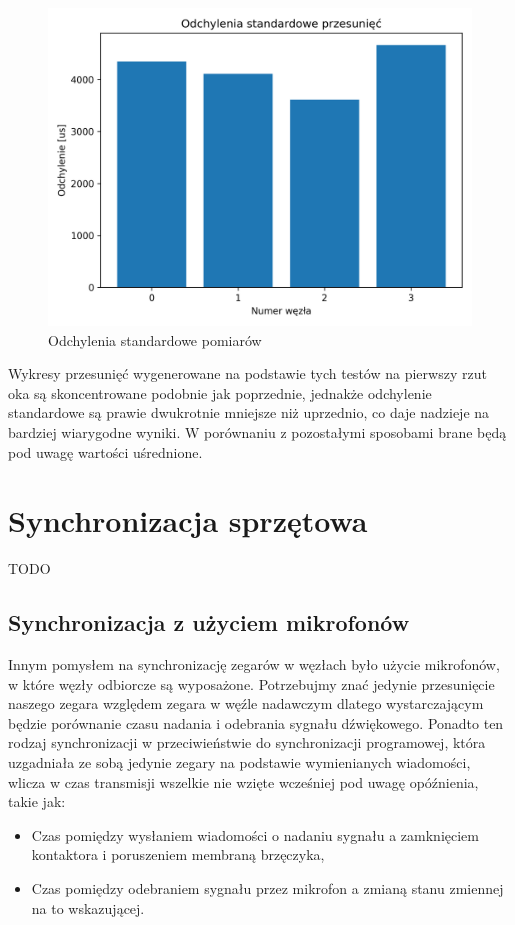 \begin{figure}[H]
    \centering
    \includegraphics[width=.49\textwidth]{pics/time_deltas/stddev.png}
    \caption{Odchylenia standardowe pomiarów}
    \label{pic:stddev_deltas}
\end{figure}

Wykresy przesunięć wygenerowane na podstawie tych testów na pierwszy rzut oka są skoncentrowane podobnie jak poprzednie, jednakże odchylenie standardowe są prawie dwukrotnie mniejsze niż uprzednio, co daje nadzieje na bardziej wiarygodne wyniki. W porównaniu z pozostałymi sposobami brane będą pod uwagę wartości uśrednione.

\section{Synchronizacja sprzętowa}

TODO

\subsection{Synchronizacja z użyciem mikrofonów}\label{sec:mic_sync}

Innym pomysłem na synchronizację zegarów w węzłach było użycie mikrofonów, w które węzły odbiorcze są wyposażone. Potrzebujmy znać jedynie przesunięcie naszego zegara względem zegara w węźle nadawczym dlatego wystarczającym będzie porównanie czasu nadania i odebrania sygnału dźwiękowego. Ponadto ten rodzaj synchronizacji w przeciwieństwie do synchronizacji programowej, która uzgadniała ze sobą jedynie zegary na podstawie wymienianych wiadomości, wlicza w czas transmisji wszelkie nie wzięte wcześniej pod uwagę opóźnienia, takie jak:

\begin{itemize}
    \item Czas pomiędzy wysłaniem wiadomości o nadaniu sygnału a zamknięciem kontaktora i poruszeniem membraną brzęczyka,
    \item Czas pomiędzy odebraniem sygnału przez mikrofon a zmianą stanu zmiennej na to wskazującej.
\end{itemize}

